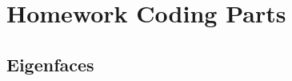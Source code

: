 \documentclass[12pt]{article}
\begin{document}

\setcounter{section}{4}
\section{Homework Coding Parts}
\setcounter{subsection}{1}
\subsection{Eigenfaces}
\end{document}
